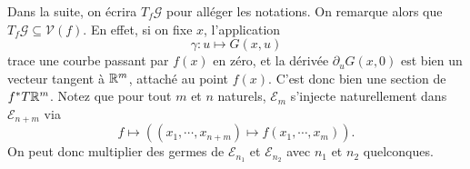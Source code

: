 \documentclass[memoire.tex]{subfiles}
\begin{document}
Dans la suite, on écrira $T_f \mathcal{G}$ pour alléger les notations. On remarque alors que $T_f\mathcal{G}\subseteq \mathcal{V}(f)$. En effet, si on fixe $x$, l'application
\begin{equation*}
    \gamma: u\mapsto G(x,u)
\end{equation*}
trace une courbe passant par $f(x)$ en zéro, 
et la dérivée $\partial_u G(x,0)$ est bien un 
vecteur tangent à $\mathbb{R}^m$, attaché au point $f
(x)$. C'est donc bien une section de $f^* T\mathbb{R}^m$.
Notez que pour tout $m$ et $n$ naturels, $\mathcal{E}_m$ s'injecte naturellement dans $\mathcal{E}_{n+m}$ via
\begin{equation*}
    f\mapsto ((x_1,\cdots,x_{n
    +m})\mapsto f(x_1,\cdots,
    x_m)).
\end{equation*}
On peut donc multiplier des germes de $\mathcal{E}_{n_1}$ et $\mathcal{E}_{n_2}$ avec $n_1$ et $n_2$ quelconques.
\end{document}
